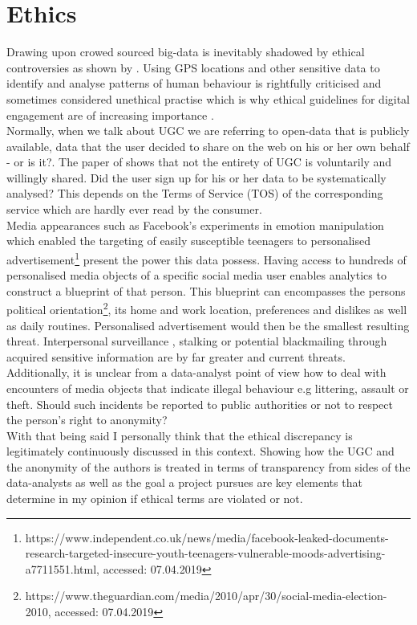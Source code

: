 \section{Ethics}
Drawing upon crowed sourced big-data is inevitably shadowed by ethical controversies as shown by \textcite{Taylor2018}. Using GPS locations and other sensitive data to identify and analyse patterns of human behaviour is rightfully criticised and sometimes considered unethical practise \parencite{Taylor2018} which is why ethical guidelines for digital engagement are of increasing importance \parencite{Bowen2013}.\\
Normally, when we talk about UGC we are referring to open-data that is publicly available, data that the user decided to share on the web on his or her own behalf - or is it?. The paper of \textcite{Estima2016} shows that not the entirety of UGC is voluntarily and willingly shared. Did the user sign up for his or her data to be systematically analysed? This depends on the Terms of Service (TOS) of the corresponding service which are hardly ever read by the consumer.\\
Media appearances such as Facebook's experiments in emotion manipulation \parencite{Jouhki2016} which enabled the targeting of easily susceptible teenagers to personalised advertisement\footnote{https://www.independent.co.uk/news/media/facebook-leaked-documents-research-targeted-insecure-youth-teenagers-vulnerable-moods-advertising-a7711551.html, accessed: 07.04.2019} present the power this data possess. Having access to hundreds of personalised media objects of a specific social media user enables analytics to construct a blueprint of that person. This blueprint can encompasses the persons political orientation\footnote{https://www.theguardian.com/media/2010/apr/30/social-media-election-2010, accessed: 07.04.2019}, its home and work location, preferences and dislikes as well as daily routines. Personalised advertisement would then be the smallest resulting threat. Interpersonal surveillance \parencite{Trottier2017}, stalking \parencite{Lyndon2011} or potential blackmailing through acquired sensitive information are by far greater and current threats. Additionally, it is unclear from a data-analyst point of view how to deal with encounters of media objects that indicate illegal behaviour e.g littering, assault or theft. Should such incidents be reported to public authorities or not to respect the person's right to anonymity?\\

With that being said I personally think that the ethical discrepancy is legitimately continuously discussed in this context. Showing how the UGC and the anonymity of the authors is treated in terms of transparency from sides of the data-analysts as well as the goal a project pursues are key elements that determine in my opinion if ethical terms are violated or not. \\

